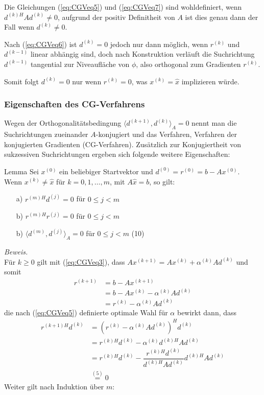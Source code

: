 Die Gleichungen (\ref{eq:CGVeq5}) und (\ref{eq:CGVeq7}) sind wohldefiniert, wenn ${d^{(k)H}}Ad^{(k)}\neq 0$, 
aufgrund der positiv Definitheit von $A$ ist dies genau dann der Fall wenn $d^{(k)}\neq 0$. 

Nach (\ref{eq:CGVeq6}) ist $d^{(k)} = 0$ jedoch nur dann möglich, wenn $r^{(k)}$ und $d^{(k-1)}$ linear abhängig sind, 
doch nach Konstruktion verläuft die Suchrichtung $d^{(k-1)}$ tangential zur Niveaufläche von $\phi$, 
also orthogonal zum Gradienten $r^{(k)}$.

Somit folgt $d^{(k)} = 0$ nur wenn $r^{(k)}=0$, was $x^{(k)}=\hat{x}$ implizieren würde. 

\subsubsection{Eigenschaften des CG-Verfahrens}
Wegen der Orthogonalitätsbedingung $\langle d^{(k+1)},d^{(k)}\rangle_A=0$ nennt man die 
Suchrichtungen zueinander $A$-konjugiert und das Verfahren, Verfahren der konjugierten Gradienten (CG-Verfahren). 
Zusätzlich zur Konjugiertheit von sukzessiven Suchrichtungen ergeben sich folgende weitere Eigenschaften:

\begin{colbox}{Lemma}\label{lem:CGVprop}
  Sei $x^{(0)}$ ein beliebiger Startvektor und $d^{(0)}=r^{(0)}=b-Ax^{(0)}$. \\
  Wenn $x^{(k)}\neq \hat{x}$ für $k=0,1,\dots, m$, mit $A\hat{x}=b$, so gilt:
  \begin{enumerate}
    \item[a)] ${r^{(m)H}}d^{(j)}=0$ für $0\leq j < m$
    \item[b)] ${r^{(m)H}}r^{(j)}=0$ für $0\leq j < m$ 
    \item[b)] $\langle d^{(m)}, d^{(j)}\rangle_A=0$ für $0\leq j < m$ \qquad (10)\label{eq:CGVeq10}
  \end{enumerate}
\end{colbox}

\textit{Beweis.} \\
Für $k\geq 0$ gilt mit (\ref{eq:CGVeq3}), dass $Ax^{(k+1)} = Ax^{(k)} + \alpha^{(k)} Ad^{(k)}$ und somit 
%
\begin{align*}
  r^{(k+1)} 
  &= b - Ax^{(k+1)} \\
  &= b - Ax^{(k)} - \alpha^{(k)} Ad^{(k)}\\
  &= r^{(k)}-\alpha^{(k)}Ad^{(k)}
  \tag{8}\label{eq:CGVeq8}
\end{align*}
%
die nach (\ref{eq:CGVeq5}) definierte optimale Wahl für $\alpha$ bewirkt dann, dass
%
\begin{align*}
  {r^{(k+1)H}}d^{(k)} &= (r^{(k)}-\alpha^{(k)}Ad^{(k)})^H d^{(k)} \\
  &= {r^{(k)H}} d^{(k)} - \alpha^{(k)}{d^{(k)H}}Ad^{(k)} \\
  &= {r^{(k)H}} d^{(k)} - \dfrac{{r^{(k)H}} d^{(k)}}{d^{(k)H}Ad^{(k)}} d^{(k)H}Ad^{(k)} \\
  &\stackrel{(5)}{=} 0 
  \tag{9}\label{eq:CGVeq9}
\end{align*}
%
Weiter gilt nach Induktion über $m$: 

